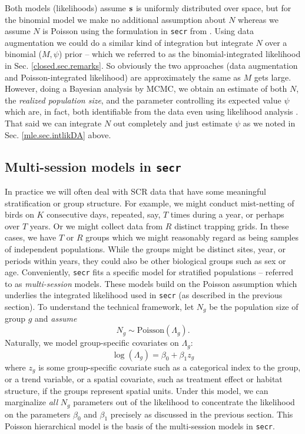 Both models (likelihoods) assume ${\bf s}$ is uniformly distributed
over space, but for the binomial model we make no additional
assumption about $N$ whereas we assume $N$ is Poisson using the
formulation in \mbox{\tt secr} from \citep{borchers_efford:2008}.
Using data augmentation we could do a similar kind of integration but
integrate $N$ over a binomial ($M,\psi$) prior -- which we referred to
as the binomial-integrated likelihood in
Sec. \ref{closed.sec.remarks}. So obviously the two approaches (data
augmentation and Poisson-integrated likelihood) are approximately the
same as $M$ gets large. However, doing a Bayesian analysis by MCMC, we
obtain an estimate of both $N$, the {\it realized population size},
and the parameter controlling its expected value $\psi$ which are, in
fact, both identifiable from the data even using likelihood analysis
\citep{royle_etal:2007}.  That said we can integrate $N$ out
completely and just estimate $\psi$ as we noted in Sec.
\ref{mle.sec.intlikDA} above.  











\subsection{Multi-session models in \mbox{\tt secr}}
\label{mle.sec.multisession}

In practice we will often deal with SCR data that have some meaningful
stratification or group structure.  For example, we might conduct
mist-netting of birds on $K$ consecutive days, repeated, say, $T$
times during a year, or perhaps over $T$ years. Or we might collect
data from $R$ distinct trapping grids.  In these cases, we have $T$ or
$R$ groups which we might reasonably regard as being samples of
independent populations.  While the groups might be distinct sites,
year, or periods within years, they could also be other biological
groups such as sex or age.  Conveniently, \mbox{\tt secr} fits a
specific model for stratified populations -- referred to as {\it
  multi-session} models. These models build on the Poisson assumption
which underlies the integrated likelihood used in \mbox{\tt secr} (as
described in the previous section).  To understand the technical
framework, let $N_{g}$ be the population size of group $g$ and {\it
  assume}
\[
 N_{g} \sim \mbox{Poisson}(\Lambda_{g}).
\]
Naturally, we model group-specific covariates on $\Lambda_{g}$:
\[
 \log(\Lambda_{g}) = \beta_{0} + \beta_{1} z_{g}
\]
where $z_{g}$ is some group-specific covariate such as a categorical index to the group, or a trend variable, or a spatial 
covariate, such as treatment effect or habitat structure, if the groups
represent spatial units. 
Under this model,  we can marginalize {\it all} $N_{g}$ parameters out
of the likelihood to concentrate the likelihood on the parameters
$\beta_{0}$ and $\beta_{1}$ precisely as discussed in the previous
section. This Poisson hierarchical model 
is the basis of the multi-session models in \mbox{\tt  secr}.


